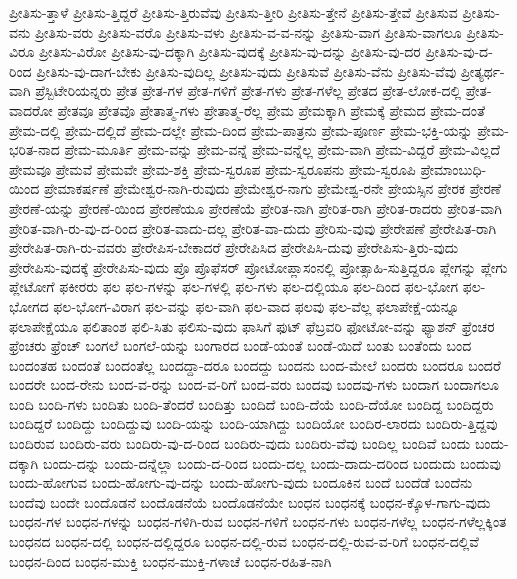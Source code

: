 {ಪ್ರೀತಿಸು-ತ್ತಾಳೆ
ಪ್ರೀತಿಸು-ತ್ತಿದ್ದರೆ
ಪ್ರೀತಿಸು-ತ್ತಿರುವೆವು
ಪ್ರೀತಿಸು-ತ್ತೀರಿ
ಪ್ರೀತಿಸು-ತ್ತೇನೆ
ಪ್ರೀತಿಸು-ತ್ತೇವೆ
ಪ್ರೀತಿಸುವ
ಪ್ರೀತಿಸು-ವನು
ಪ್ರೀತಿಸು-ವರು
ಪ್ರೀತಿಸು-ವರೊ
ಪ್ರೀತಿಸು-ವಳು
ಪ್ರೀತಿಸು-ವ-ವ-ನನ್ನು
ಪ್ರೀತಿಸು-ವಾಗ
ಪ್ರೀತಿಸು-ವಾಗಲೂ
ಪ್ರೀತಿಸು-ವಿರೂ
ಪ್ರೀತಿಸು-ವಿರೋ
ಪ್ರೀತಿಸು-ವು-ದಕ್ಕಾಗಿ
ಪ್ರೀತಿಸು-ವುದಕ್ಕೆ
ಪ್ರೀತಿಸು-ವು-ದನ್ನು
ಪ್ರೀತಿಸು-ವು-ದರ
ಪ್ರೀತಿಸು-ವು-ದ-ರಿಂದ
ಪ್ರೀತಿಸು-ವು-ದಾಗ-ಬೇಕು
ಪ್ರೀತಿಸು-ವುದಿಲ್ಲ
ಪ್ರೀತಿಸು-ವುದು
ಪ್ರೀತಿಸುವೆ
ಪ್ರೀತಿಸು-ವೆನು
ಪ್ರೀತಿಸು-ವೆವು
ಪ್ರೀತ್ಯರ್ಥ-ವಾಗಿ
ಪ್ರೆಸ್ಬಿಟೇರಿಯನ್ನರು
ಪ್ರೇತ
ಪ್ರೇತ-ಗಳ
ಪ್ರೇತ-ಗಳಿಗೆ
ಪ್ರೇತ-ಗಳು
ಪ್ರೇತ-ಗಳೆಲ್ಲ
ಪ್ರೇತದ
ಪ್ರೇತ-ಲೋಕ-ದಲ್ಲಿ
ಪ್ರೇತ-ವಾದರೋ
ಪ್ರೇತವೂ
ಪ್ರೇತವೊ
ಪ್ರೇತಾತ್ಮ-ಗಳು
ಪ್ರೇತಾತ್ಮ-ರೆಲ್ಲ
ಪ್ರೇಮ
ಪ್ರೇಮಕ್ಕಾಗಿ
ಪ್ರೇಮಕ್ಕೆ
ಪ್ರೇಮದ
ಪ್ರೇಮ-ದಂತೆ
ಪ್ರೇಮ-ದಲ್ಲಿ
ಪ್ರೇಮ-ದಲ್ಲಿದೆ
ಪ್ರೇಮ-ದಲ್ಲೇ
ಪ್ರೇಮ-ದಿಂದ
ಪ್ರೇಮ-ಪಾತ್ರನು
ಪ್ರೇಮ-ಪೂರ್ಣ
ಪ್ರೇಮ-ಭಕ್ತಿ-ಯನ್ನು
ಪ್ರೇಮ-ಭರಿತ-ನಾದ
ಪ್ರೇಮ-ಮೂರ್ತಿ
ಪ್ರೇಮ-ವನ್ನು
ಪ್ರೇಮ-ವನ್ನೆ
ಪ್ರೇಮ-ವನ್ನೆಲ್ಲ
ಪ್ರೇಮ-ವಾಗಿ
ಪ್ರೇಮ-ವಿದ್ದರೆ
ಪ್ರೇಮ-ವಿಲ್ಲದೆ
ಪ್ರೇಮವೂ
ಪ್ರೇಮವೆ
ಪ್ರೇಮವೇ
ಪ್ರೇಮ-ಶಕ್ತಿ
ಪ್ರೇಮ-ಸ್ವರೂಪ
ಪ್ರೇಮ-ಸ್ವರೂಪನು
ಪ್ರೇಮ-ಸ್ವರೂಪಿ
ಪ್ರೇಮಾಂಬುಧಿ-ಯಿಂದ
ಪ್ರೇಮಾಕರ್ಷಣೆ
ಪ್ರೇಮೇಶ್ವರ-ನಾಗಿ-ರುವುದು
ಪ್ರೇಮೇಶ್ವರ-ನಾಗು
ಪ್ರೇಮೇಶ್ವ-ರನೇ
ಪ್ರೇಯಸ್ಸಿನ
ಪ್ರೇರಕ
ಪ್ರೇರಣೆ
ಪ್ರೇರಣೆ-ಯನ್ನು
ಪ್ರೇರಣೆ-ಯಿಂದ
ಪ್ರೇರಣೆಯೂ
ಪ್ರೇರಣೆಯೆ
ಪ್ರೇರಿತ-ನಾಗಿ
ಪ್ರೇರಿತ-ರಾಗಿ
ಪ್ರೇರಿತ-ರಾದರು
ಪ್ರೇರಿತ-ವಾಗಿ
ಪ್ರೇರಿತ-ವಾಗಿ-ರು-ವು-ದ-ರಿಂದ
ಪ್ರೇರಿತ-ವಾದು-ದಲ್ಲ
ಪ್ರೇರಿತ-ವಾ-ದುದು
ಪ್ರೇರಿಸು-ವುವು
ಪ್ರೇರೇಪಣೆ
ಪ್ರೇರೇಪಿತ-ರಾಗಿ
ಪ್ರೇರೇಪಿತ-ರಾಗಿ-ರು-ವವರು
ಪ್ರೇರೇಪಿಸ-ಬೇಕಾದರೆ
ಪ್ರೇರೇಪಿಸಿದ
ಪ್ರೇರೇಪಿಸಿ-ದುವು
ಪ್ರೇರೇಪಿಸು-ತ್ತಿರು-ವುದು
ಪ್ರೇರೇಪಿಸು-ವುದಕ್ಕೆ
ಪ್ರೇರೇಪಿಸು-ವುದು
ಪ್ರೊ
ಪ್ರೊಫೆಸರ್
ಪ್ರೋಟೋಪ್ಲಾಸಂನಲ್ಲಿ
ಪ್ರೋತ್ಸಾಹಿ-ಸುತ್ತಿದ್ದರೂ
ಪ್ಲೇಗನ್ನು
ಪ್ಲೇಗು
ಪ್ಲೇಟೋಗೆ
ಫಕೀರರು
ಫಲ
ಫಲ-ಗಳನ್ನು
ಫಲ-ಗಳಲ್ಲಿ
ಫಲ-ಗಳು
ಫಲ-ದಲ್ಲಿಯೂ
ಫಲ-ದಿಂದ
ಫಲ-ಭೋಗ
ಫಲ-ಭೋಗದ
ಫಲ-ಭೋಗ-ವಿರಾಗ
ಫಲ-ವನ್ನು
ಫಲ-ವಾಗಿ
ಫಲ-ವಾದ
ಫಲವು
ಫಲ-ವೆಲ್ಲ
ಫಲಾಪೇಕ್ಷೆ-ಯನ್ನೂ
ಫಲಾಪೇಕ್ಷೆಯೂ
ಫಲಿತಾಂಶ
ಫಲಿ-ಸಿತು
ಫಲಿಸು-ವುದು
ಫಾಸಿಗೆ
ಫುಟ್
ಫೆಬ್ರವರಿ
ಫೋಟೋ-ವನ್ನು
ಫ್ಯಾಶನ್
ಫ್ರೆಂಚರ
ಫ್ರೆಂಚರು
ಫ್ರೆಂಚ್
ಬಂಗಲೆ
ಬಂಗಲೆ-ಯನ್ನು
ಬಂಗಾರದ
ಬಂಡೆ-ಯಂತೆ
ಬಂಡೆ-ಯಿದೆ
ಬಂತು
ಬಂತೆಂದು
ಬಂದ
ಬಂದಂತಹ
ಬಂದಂತೆ
ಬಂದಂತೆಲ್ಲ
ಬಂದದ್ದಾ-ದರೂ
ಬಂದದ್ದು
ಬಂದನು
ಬಂದ-ಮೇಲೆ
ಬಂದರು
ಬಂದರೂ
ಬಂದರೆ
ಬಂದರೇ
ಬಂದ-ರೇನು
ಬಂದ-ವ-ರನ್ನು
ಬಂದ-ವ-ರಿಗೆ
ಬಂದ-ವರು
ಬಂದವು
ಬಂದವು-ಗಳು
ಬಂದಾಗ
ಬಂದಾಗಲೂ
ಬಂದಿ
ಬಂದಿ-ಗಳು
ಬಂದಿತು
ಬಂದಿ-ತೆಂದರೆ
ಬಂದಿತ್ತು
ಬಂದಿದೆ
ಬಂದಿ-ದೆಯೆ
ಬಂದಿ-ದೆಯೋ
ಬಂದಿದ್ದ
ಬಂದಿದ್ದರು
ಬಂದಿದ್ದರೆ
ಬಂದಿದ್ದು
ಬಂದಿದ್ದುವು
ಬಂದಿ-ಯನ್ನು
ಬಂದಿ-ಯಾಗಿದ್ದು
ಬಂದಿಯೋ
ಬಂದಿರ-ಲಾರದು
ಬಂದಿರು-ತ್ತಿದ್ದವು
ಬಂದಿರುವ
ಬಂದಿರು-ವರು
ಬಂದಿರು-ವು-ದ-ರಿಂದ
ಬಂದಿರು-ವುದು
ಬಂದಿರು-ವೆವು
ಬಂದಿಲ್ಲ
ಬಂದಿವೆ
ಬಂದು
ಬಂದು-ದಕ್ಕಾಗಿ
ಬಂದು-ದನ್ನು
ಬಂದು-ದನ್ನೆಲ್ಲಾ
ಬಂದು-ದ-ರಿಂದ
ಬಂದು-ದಲ್ಲ
ಬಂದು-ದಾದು-ದರಿಂದ
ಬಂದುದು
ಬಂದುವು
ಬಂದು-ಹೋಗುವ
ಬಂದು-ಹೋಗು-ವು-ದನ್ನು
ಬಂದು-ಹೋಗು-ವುದು
ಬಂದೂಕಿನ
ಬಂದೆ
ಬಂದೆಡೆ
ಬಂದೆನು
ಬಂದೆವು
ಬಂದೇ
ಬಂದೊಡನೆ
ಬಂದೊಡನೆಯೆ
ಬಂದೊಡನೆಯೇ
ಬಂಧನ
ಬಂಧನಕ್ಕೆ
ಬಂಧನ-ಕ್ಕೊಳ-ಗಾಗು-ವುದು
ಬಂಧನ-ಗಳ
ಬಂಧನ-ಗಳನ್ನು
ಬಂಧನ-ಗಳಿಗಿ-ರುವ
ಬಂಧನ-ಗಳಿಗೆ
ಬಂಧನ-ಗಳು
ಬಂಧನ-ಗಳೆಲ್ಲ
ಬಂಧನ-ಗಳೆಲ್ಲಕ್ಕಿಂತ
ಬಂಧನದ
ಬಂಧನ-ದಲ್ಲಿ
ಬಂಧನ-ದಲ್ಲಿದ್ದರೂ
ಬಂಧನ-ದಲ್ಲಿ-ರುವ
ಬಂಧನ-ದಲ್ಲಿ-ರುವ-ವ-ರಿಗೆ
ಬಂಧನ-ದಲ್ಲಿವೆ
ಬಂಧನ-ದಿಂದ
ಬಂಧನ-ಮುಕ್ತಿ
ಬಂಧನ-ಮುಕ್ತಿ-ಗಳಾಚೆ
ಬಂಧನ-ರಹಿತ-ನಾಗಿ
}
